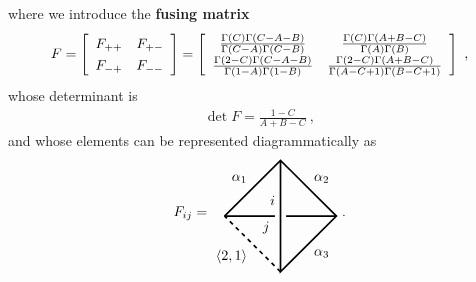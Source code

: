 \documentclass[12pt,a4paper,notitlepage]{report}
\numberwithin{equation}{section}
\theoremstyle{break}
\begin{document}
where we introduce the \textbf{fusing matrix} 
\begin{align}
 F = \left[\begin{array}{cc} F_{++} & F_{+-} \\ F_{-+} & F_{--} \end{array}\right] 
= \left[\renewcommand{\arraystretch}{1.3}\begin{array}{cc}
         \frac{\Gamma(C)\Gamma(C-A-B)}{\Gamma(C-A)\Gamma(C-B)} & \frac{\Gamma(C)\Gamma(A+B-C)}{\Gamma(A)\Gamma(B)} 
       \\   \frac{\Gamma(2-C)\Gamma(C-A-B)}{\Gamma(1-A)\Gamma(1-B)} & \frac{\Gamma(2-C)\Gamma(A+B-C)}{\Gamma(A-C+1)\Gamma(B-C+1)}
        \end{array}\right]\ ,
\label{fmd}
\end{align}
whose determinant is 
\begin{align}
 \det F = \frac{1-C}{A+B-C}\ ,
\label{detf}
\end{align}
and whose elements can be represented diagrammatically as
\begin{align}
F_{ij} =
\begin{tikzpicture}[baseline=(current  bounding  box.center), very thick, scale = .7]
\draw (-2, 0) -- node [above left] {$\alpha_1$} (0, 2) -- node [above right] {$\alpha_2$} (2, 0) -- node [below right] {$\alpha_3$} (0, -2) -- (0, 2);
\draw[dashed] (0, -2) -- node [below left] {$\langle 2,1 \rangle$} (-2, 0);
\draw (-2, 0) -- (-.2, 0) node [below left] {$j$}; \draw (.2, 0) -- (2, 0);
\node [above left] at (0, .2) {$i$};
\end{tikzpicture}
\ .
\label{fpic}
\end{align}
\end{document}
